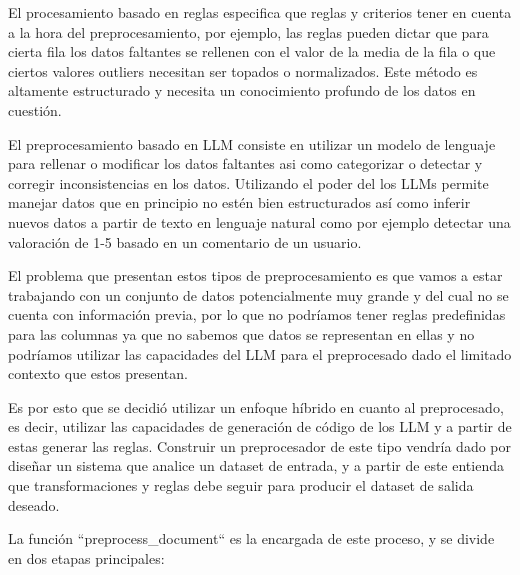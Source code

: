El procesamiento basado en reglas especifica que reglas y criterios tener en cuenta a la hora del preprocesamiento, por ejemplo, las reglas pueden dictar que para cierta fila los datos faltantes se rellenen con el valor de la media de la fila o que ciertos valores outliers necesitan ser topados o normalizados. Este método es altamente estructurado y necesita un conocimiento profundo de los datos en cuestión.

El preprocesamiento basado en LLM consiste en utilizar un modelo de lenguaje para rellenar o modificar los datos faltantes asi como categorizar o detectar y corregir inconsistencias en los datos. Utilizando el poder del los LLMs permite manejar datos que en principio no estén bien estructurados así como inferir nuevos datos a partir de texto en lenguaje natural como por ejemplo detectar una valoración de 1-5 basado en un comentario de un usuario.

El problema que presentan estos tipos de preprocesamiento es que vamos a estar trabajando con un conjunto de datos potencialmente muy grande y del cual no se cuenta con información previa, por lo que no podríamos tener reglas predefinidas para las columnas ya que no sabemos que datos se representan en ellas y no podríamos utilizar las capacidades del LLM para el preprocesado dado el limitado contexto que estos presentan.

Es por esto que se decidió utilizar un enfoque híbrido en cuanto al preprocesado, es decir, utilizar las capacidades de generación de código de los LLM y a partir de estas generar las reglas. Construir un preprocesador de este tipo vendría dado por diseñar un sistema que analice un dataset de entrada, y a partir de este entienda que transformaciones y reglas debe seguir para producir el dataset de salida deseado.

La función ``preprocess\_document`` es la encargada de este proceso, y se divide en dos etapas principales:

